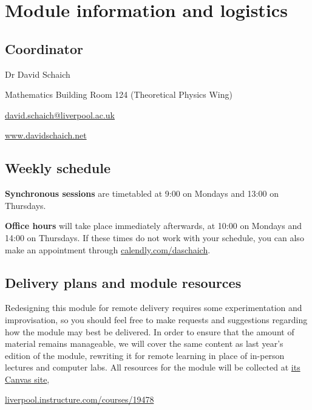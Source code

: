 \newcommand{\thisweek}{MATH327 information}
\newcommand{\moddate}{Last modified 28 Mar.~2021}
\setcounter{section}{0}
{}
\section*{Module information and logistics}

\subsection*{Coordinator}
\begin{description}
  \setlength{\itemsep}{1pt}
  \setlength{\parskip}{0pt}
  \setlength{\parsep}{0pt}
  \item[\qquad] Dr David Schaich
  \item[\qquad] Mathematics Building Room 124 (Theoretical Physics Wing)
  \item[\qquad] \href{mailto:david.schaich@liverpool.ac.uk}{david.schaich@liverpool.ac.uk}
  \item[\qquad] \href{http://www.davidschaich.net}{www.davidschaich.net}
\end{description}



\subsection*{Weekly schedule}
\textbf{Synchronous sessions} are timetabled at 9:00 on Mondays and 13:00 on Thursdays.

\textbf{Office hours} will take place immediately afterwards, at 10:00 on Mondays and 14:00 on Thursdays.
If these times do not work with your schedule, you can also make an appointment through \href{https://calendly.com/daschaich}{calendly.com/daschaich}.



\subsection*{Delivery plans and module resources}
Redesigning this module for remote delivery requires some experimentation and improvisation, so you should feel free to make requests and suggestions regarding how the module may best be delivered.
In order to ensure that the amount of material remains manageable, we will cover the same content as last year's edition of the module, rewriting it for remote learning in place of in-person lectures and computer labs.
All resources for the module will be collected at \href{https://liverpool.instructure.com/courses/19478}{its Canvas site}, \\
\centerline{\href{https://liverpool.instructure.com/courses/19478}{liverpool.instructure.com/courses/19478}}

